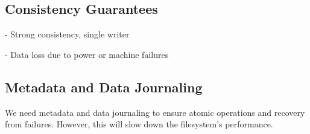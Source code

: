 \documentclass[]{article}
\newcommand{\subtopic}[1]{\vspace{1.5pt} \noindent \textbf{#1}}
\begin{document}
\subsection{Consistency Guarantees}

- Strong consistency, single writer

- Data loss due to power or machine failures


\subsection{Metadata and Data Journaling}

We need metadata and data journaling to ensure atomic operations and recovery from failures. However,
this will slow down the filesystem's performance. 





\end{document}
